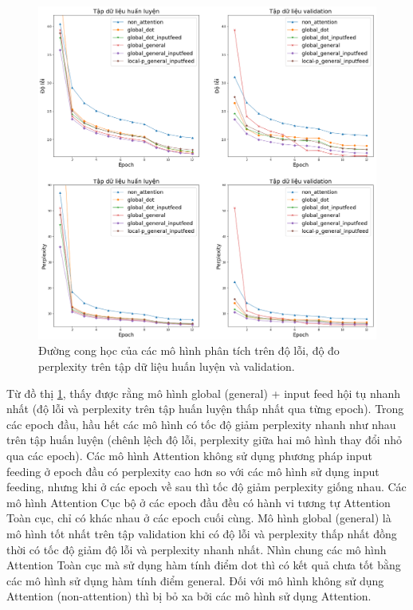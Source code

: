 \begin{figure}
	\centering
	\includegraphics[width=1.0\textwidth]{train_valid_xent_ppl_scaled.png}
	\caption[Đường cong học của các mô hình]{Đường cong học của các mô hình phân tích trên độ lỗi, độ đo perplexity trên tập dữ liệu huấn luyện và validation.}
	\label{fig_learning_curve}
\end{figure}

Từ đồ thị \ref{fig_learning_curve}, thấy được rằng mô hình global (general) + input feed hội tụ nhanh nhất (độ lỗi và perplexity trên tập huấn luyện thấp nhất qua từng epoch). Trong các epoch đầu, hầu hết các mô hình có tốc độ giảm perplexity nhanh như nhau trên tập huấn luyện (chênh lệch độ lỗi, perplexity giữa hai mô hình thay đổi nhỏ qua các epoch). Các mô hình Attention không sử dụng phương pháp input feeding ở epoch đầu có perplexity cao hơn so với các mô hình sử dụng input feeding, nhưng khi ở các epoch về sau thì tốc độ giảm perplexity giống nhau. Các mô hình Attention Cục bộ ở các epoch đầu đều có hành vi tương tự Attention Toàn cục, chỉ có khác nhau ở các epoch cuối cùng. Mô hình global (general) là mô hình tốt nhất trên tập validation khi có độ lỗi và perplexity thấp nhất đồng thời có tốc độ giảm độ lỗi và perplexity nhanh nhất. Nhìn chung các mô hình Attention Toàn cục mà sử dụng hàm tính điểm dot thì có kết quả chưa tốt bằng các mô hình sử dụng hàm tính điểm general. Đối với mô hình không sử dụng Attention (non-attention) thì bị bỏ xa bởi các mô hình sử dụng Attention.

